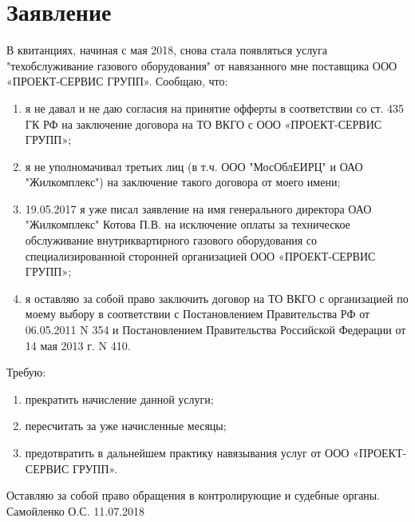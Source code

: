 \documentclass[a4paper,12pt]{article}
\begin{document}
\section{Заявление}

В квитанциях, начиная с мая 2018, снова стала появляться услуга "техобслуживание газового оборудования" от навязанного мне поставщика ООО «ПРОЕКТ-СЕРВИС ГРУПП».
Сообщаю, что:
\begin{enumerate}
	\item я не давал и не даю согласия на принятие офферты в соответствии со ст. 435 ГК РФ на заключение договора на ТО ВКГО с ООО «ПРОЕКТ-СЕРВИС ГРУПП»;
	\item я не уполномачивал третьих лиц (в т.ч. ООО "МосОблЕИРЦ" и ОАО "Жилкомплекс") на заключение такого договора от моего имени;
	\item 19.05.2017 я уже писал заявление на имя генерального директора ОАО "Жилкомплекс" Котова П.В. на исключение оплаты за техническое обслуживание внутриквартирного газового оборудования со специализированной сторонней организацией ООО «ПРОЕКТ-СЕРВИС ГРУПП»;
	\item я оставляю за собой право заключить договор на ТО ВКГО с организацией по моему выбору в соответствии с Постановлением Правительства РФ от 06.05.2011 N 354 и Постановлением Правительства Российской Федерации от 14 мая 2013 г. N 410.
\end{enumerate}

Требую:
\begin{enumerate}
	\item прекратить начисление данной услуги;
	\item пересчитать за уже начисленные месяцы;
	\item предотвратить в дальнейшем практику навязывания услуг от ООО «ПРОЕКТ-СЕРВИС ГРУПП».
\end{enumerate}

Оставляю за собой право обращения в контролирующие и судебные органы.\\

Самойленко О.С.
11.07.2018
\end{document}
